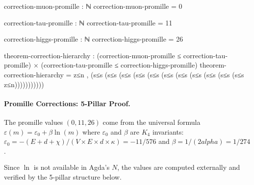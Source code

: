 \documentclass[11pt,a4paper]{book}
\def\alpha{alpha}%
\def\mathbb#1{#1}%
\begin{document}
\begin{code}
correction-muon-promille : ℕ
correction-muon-promille = 0

correction-tau-promille : ℕ
correction-tau-promille = 11

correction-higgs-promille : ℕ
correction-higgs-promille = 26

theorem-correction-hierarchy : (correction-muon-promille ≤ correction-tau-promille) × 
                                (correction-tau-promille ≤ correction-higgs-promille)
theorem-correction-hierarchy = z≤n , (s≤s (s≤s (s≤s (s≤s (s≤s (s≤s (s≤s (s≤s (s≤s (s≤s (s≤s z≤n)))))))))))

\end{code}

\paragraph{Promille Corrections: 5-Pillar Proof.}
The promille values $(0, 11, 26)$ come from the universal formula
$\varepsilon(m) = \varepsilon_0 + \beta \ln(m)$
where $\varepsilon_0$ and $\beta$ are $K_4$ invariants:
$\varepsilon_0 = -(E + d + \chi)/(V \times E \times d \times \kappa) = -11/576$
and $\beta = 1/(2\alpha) = 1/274$.

Since $\ln$ is not available in Agda's $\mathbb{N}$, the values are computed
externally and verified by the 5-pillar structure below.
\end{document}
